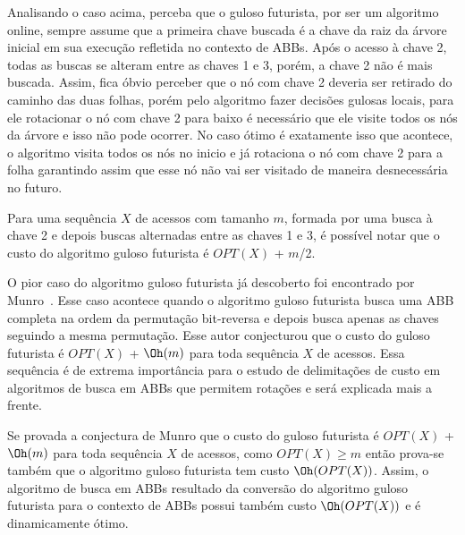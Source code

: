 Analisando o caso acima, perceba que o guloso futurista, por ser um algoritmo online, sempre assume que a primeira chave buscada é a chave da raiz da árvore inicial em sua execução refletida no contexto de ABBs. Após o acesso à chave 2, todas as buscas se alteram entre as chaves 1 e 3, porém, a chave 2 não é mais buscada. Assim, fica óbvio perceber que o nó com chave 2 deveria ser retirado do caminho das duas folhas, porém pelo algoritmo fazer decisões gulosas locais, para ele rotacionar o nó com chave 2 para baixo é necessário que ele visite todos os nós da árvore e isso não pode ocorrer. No caso ótimo é exatamente isso que acontece, o algoritmo visita todos os nós no inicio e já rotaciona o nó com chave 2 para a folha garantindo assim que esse nó não vai ser visitado de maneira desnecessária no futuro.

Para uma sequência $X$ de acessos com tamanho $m$, formada por uma busca à chave 2 e depois buscas alternadas entre as chaves 1 e 3, é possível notar que o custo do algoritmo guloso futurista é $OPT(X)$ + $m$/2.

O pior caso do algoritmo guloso futurista já descoberto foi encontrado por Munro~\cite{munro}. Esse caso acontece quando o algoritmo guloso futurista busca uma ABB completa na ordem da permutação bit-reversa e depois busca apenas as chaves seguindo a mesma permutação. Esse autor conjecturou que o custo do guloso futurista é $OPT(X)$ + $\Oh(m)$ para toda sequência $X$ de acessos. Essa sequência é de extrema importância para o estudo de delimitações de custo em algoritmos de busca em ABBs que permitem rotações e será explicada mais a frente.

Se provada a conjectura de Munro que o custo do guloso futurista é $OPT(X)$ + $\Oh(m)$ para toda sequência $X$ de acessos, como $OPT(X) \geq m$ então prova-se também que o algoritmo guloso futurista tem custo $\Oh(OPT(X))$. Assim, o algoritmo de busca em ABBs resultado da conversão do algoritmo guloso futurista para o contexto de ABBs possui também custo $\Oh(OPT(X))$ e é dinamicamente ótimo.